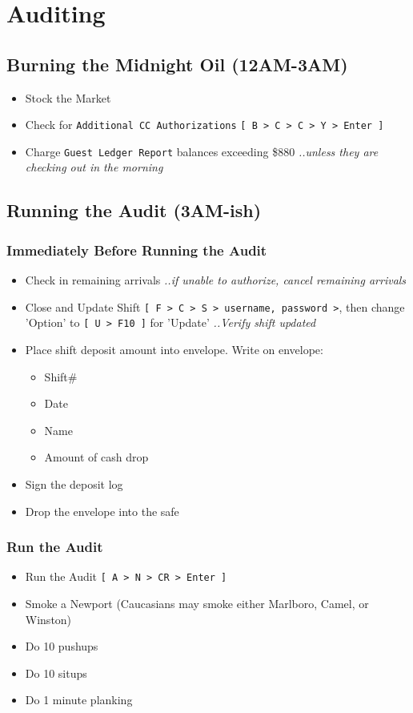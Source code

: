 \section*{Auditing}
\subsection*{Burning the Midnight Oil (12AM-3AM)}
\begin{itemize}
    \item Stock the Market
    \item Check for \verb|Additional CC Authorizations| \verb|[ B > C > C > Y > Enter ]|
    \item Charge \verb|Guest Ledger Report| balances exceeding \$880\newline
    \textit{..unless they are checking out in the morning}
\end{itemize}

\subsection*{Running the Audit (3AM-ish)}
\subsubsection{Immediately Before Running the Audit}
\begin{itemize}
    \item Check in remaining arrivals\newline 
    \textit{..if unable to authorize, cancel remaining arrivals}
    \item Close and Update Shift \verb|[ F > C > S > username, password >|, then change 'Option' to \verb|[ U > F10 ]| for 'Update'\newline
    \textit{..Verify shift updated}
    \item Place shift deposit amount into envelope. Write on envelope:
    \begin{itemize}
        \item Shift#
        \item Date
        \item Name
        \item Amount of cash drop
    \end{itemize}
    \item Sign the deposit log
    \item Drop the envelope into the safe
\end{itemize}
\subsubsection{Run the Audit}
\begin{itemize}
    \item Run the Audit \verb|[ A > N > CR > Enter ]|
    \item Smoke a Newport (Caucasians may smoke either Marlboro, Camel, or Winston)
    \item Do 10 pushups
    \item Do 10 situps
    \item Do 1 minute planking
\end{itemize}
\newpage

